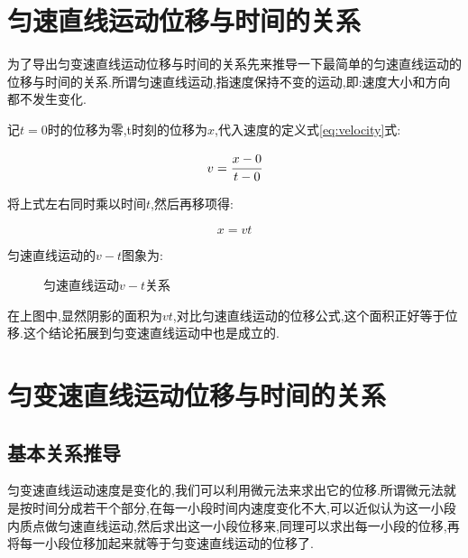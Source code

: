 \section{匀速直线运动位移与时间的关系}

为了导出匀变速直线运动位移与时间的关系先来推导一下最简单的匀速直线运动的位移与时间的关系.所谓匀速直线运动,指速度保持不变的运动,即:速度大小和方向都不发生变化.

记$t=0$时的位移为零,t时刻的位移为$x$,代入速度的定义式\eqref{eq:velocity}式:

\begin{equation*}
v=\cfrac{x-0}{t-0}
\end{equation*}

将上式左右同时乘以时间$t$,然后再移项得:

\begin{equation}
  x=vt
  \label{eq:uniform displacement}
\end{equation}

匀速直线运动的$v-t$图象为:

\begin{figure}[H]
  \centering
  \caption{匀速直线运动$v-t$关系}
  \label{fig:uniform x-t}
\end{figure}

在上图中,显然阴影的面积为$vt$,对比匀速直线运动的位移公式,这个面积正好等于位移.这个结论拓展到匀变速直线运动中也是成立的.

\section{匀变速直线运动位移与时间的关系}

\subsection{基本关系推导}

匀变速直线运动速度是变化的,我们可以利用微元法来求出它的位移.所谓微元法就是按时间分成若干个部分,在每一小段时间内速度变化不大,可以近似认为这一小段内质点做匀速直线运动,然后求出这一小段位移来,同理可以求出每一小段的位移,再将每一小段位移加起来就等于匀变速直线运动的位移了.


